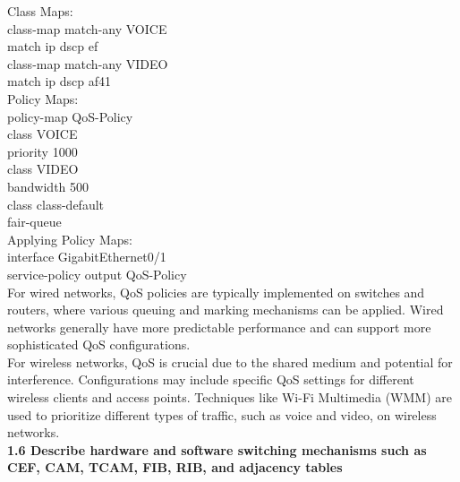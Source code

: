\documentclass{article}
\begin{document}
\noindent Class Maps:\\

\noindent class-map match-any VOICE\\
\indent match ip dscp ef\\
\noindent class-map match-any VIDEO\\
\indent match ip dscp af41\\

\noindent Policy Maps:\\

\noindent policy-map QoS-Policy\\
\indent class VOICE\\
\indent\indent priority 1000\\
\indent class VIDEO\\
\indent\indent bandwidth 500\\
\indent class class-default\\
\indent\indent fair-queue\\

\noindent Applying Policy Maps:\\

\noindent interface GigabitEthernet0/1\\
\indent service-policy output QoS-Policy\\

	For wired networks, QoS policies are typically implemented on switches and routers, where various queuing and marking mechanisms can be applied. Wired networks generally have more predictable performance and can support more sophisticated QoS configurations.\\

	For wireless networks, QoS is crucial due to the shared medium and potential for interference. Configurations may include specific QoS settings for different wireless clients and access points. Techniques like Wi-Fi Multimedia (WMM) are used to prioritize different types of traffic, such as voice and video, on wireless networks.\\

\textbf{1.6 Describe hardware and software switching mechanisms such as CEF, CAM, TCAM, FIB, RIB, and adjacency tables}\\
\end{document}
